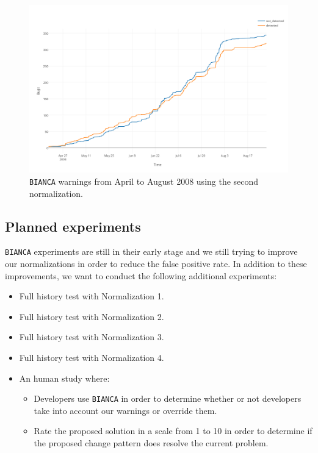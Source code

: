 \begin{figure}[h!]
  \centering
    \includegraphics[scale=0.55]{media/bianca-20.png}
    \caption{{\tt BIANCA} warnings from April to August 2008 using the second normalization.
    \label{fig:bianca-exp-2}}
\end{figure}

\subsection{Planned experiments}

{\tt BIANCA} experiments are still in their early stage and we still trying to improve our normalizations in order to reduce the false positive rate. In addition to these improvements, we want to conduct the following additional experiments:

\begin{itemize}
	\item Full history test with Normalization 1.
	\item Full history test with Normalization 2.
	\item Full history test with Normalization 3.
	\item Full history test with Normalization 4.
	\item An human study where:
	\begin{itemize}
		\item  Developers use {\tt BIANCA} in order to determine whether or not developers take into account our warnings or override them.
		\item Rate the proposed solution in a scale from 1 to 10 in order to determine if the proposed change pattern does resolve the current problem.
	\end{itemize}
\end{itemize}
